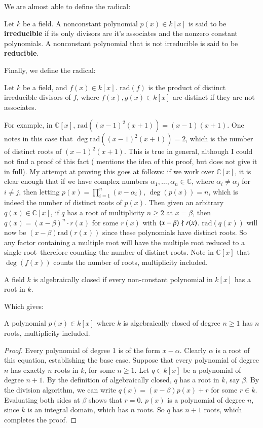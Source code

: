 \documentclass[12pt]{article}
\newenvironment{corollary}{\begin{mycorollary}}{\end{mycorollary}}
\theoremstyle{definitionstyle}
\newenvironment{definition}{\begin{mydef}}{\end{mydef}}
\def\mbb#1{\mathbb{#1}}
\def \C{\mbb{C}}
\begin{document}
We are almost able to define the radical:
\begin{definition}
	Let $k$ be a field. A nonconstant polynomial $p(x) \in k[x]$ is said to be \textbf{irreducible} if its only divisors are it's associates and the nonzero constant polynomials. A nonconstant polynomial that is not irreducible is said to be \textbf{reducible}.
\end{definition}
Finally, we define the radical:
\begin{definition}
	Let $k$ be a field, and $f(x) \in k[x]$. $\mathrm{rad}(f)$ is the product of distinct irreducible divisors of $f$, where $f(x), g(x) \in k[x]$ are distinct if they are not associates.
\end{definition}
For example, in $\C[x]$, $\mathrm{rad}((x-1)^2(x+1)) = (x-1)(x+1)$. One notes in this case that $\deg{\mathrm{rad}((x-1)^2(x+1))} = 2$, which is the number of distinct roots of $(x-1)^2(x+1)$. This is true in general, although I could not find a proof of this fact (\cite{lang2005algebra} mentions the idea of this proof, but does not give it in full). My attempt at proving this goes at follows: if we work over $\C[x]$, it is clear enough that if we have complex numbers $\alpha_1, \ldots, \alpha_n \in \C$, where $\alpha_i \neq \alpha_j$ for $i \neq j$, then letting $p(x) = \prod_{i=1}^n (x-\alpha_i)$, $\deg{(p(x))} = n$, which is indeed the number of distinct roots of $p(x)$. Then given an arbitrary $q(x) \in \C[x]$, if $q$ has a root of multiplicity $n \geq 2$ at $x = \beta$, then $q(x) = (x-\beta)^n \cdot r(x)$ for some $r(x)$ with $(x-\beta) \not \mid r(x)$. $\mathrm{rad}(q(x))$ will now be $(x-\beta) \mathrm{rad}(r(x))$ since these polynomials have distinct roots. So any factor containing a multiple root will have the multiple root reduced to a single root--therefore counting the number of distinct roots. Note in $\C[x]$ that $\deg(f(x))$ counts the number of roots, multiplicity included.
\begin{definition}[Algebraically closed]
	A field $k$ is algebraically closed if every non-constant polynomial in $k[x]$ has a root in $k$.
\end{definition}
Which gives:
\begin{corollary}
	A polynomial $p(x) \in k[x]$ where $k$ is algebraically closed of degree $n \geq 1$ has $n$ roots, multiplicity included.
\end{corollary}
\begin{proof}
	Every polynomial of degree 1 is of the form $x-\alpha$. Clearly $\alpha$ is a root of this equation, establishing the base case. Suppose that every polynomial of degree $n$ has exactly $n$ roots in $k$, for some $n \geq 1$. Let $q \in k[x]$ be a polynomial of degree $n+1$. By the definition of algebraically closed, $q$ has a root in $k$, say $\beta$. By the division algorithm, we can write $q(x) = (x-\beta)p(x) + r$ for some $r \in k$. Evaluating both sides at $\beta$ shows that $r = 0$. $p(x)$ is a polynomial of degree $n$, since $k$ is an integral domain, which has $n$ roots. So $q$ has $n+1$ roots, which completes the proof.
\end{proof}
\end{document}
